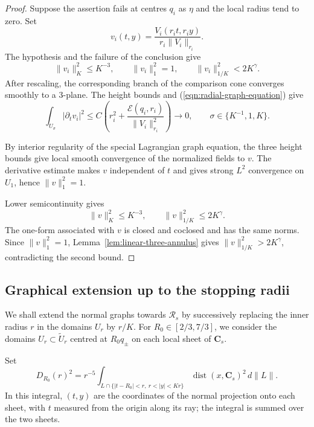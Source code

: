 \documentclass[11pt,a4paper]{article}
\numberwithin{equation}{section}
\theoremstyle{definition}
\theoremstyle{remark}
\newcommand{\dist}{\operatorname{dist}}
\begin{document}
	\begin{proof}
		Suppose the assertion fails at centres $q_i$ as $\eta$ and the local radius tend to zero.
		Set
		\[
		v_i(t,y)=\frac{V_i(r_it,r_iy)}{r_i\|V_i\|_{r_i}}.
		\]
		The hypothesis and the failure of the conclusion give
		\[
		\|v_i\|_K^2\le K^{-3},\qquad
		\|v_i\|_1^2=1,\qquad
		\|v_i\|_{1/K}^2<2K^{\gamma}.
		\]
		After rescaling, the corresponding branch of the comparison cone converges
		smoothly to a 3-plane.
		The height bounds and (\ref{eqn:radial-graph-equation}) give
		\[
		\int_{U_\sigma}|\partial_t v_i|^2
		\le C\left(r_i^2+\frac{\mathcal E(q_i,r_i)}{\|V_i\|_{r_i}^2}\right)
		\longrightarrow0,
		\qquad \sigma\in\{K^{-1},1,K\}.
		\]
		
		By interior regularity of the special Lagrangian graph equation,
		the three height bounds give local smooth convergence of the normalized
		fields to $v$. The derivative estimate makes $v$ independent of $t$ and
		gives strong $L^2$ convergence on $U_1$, hence $\|v\|_1^2=1$.
		
		Lower semicontinuity gives
		\[
		\|v\|_K^2\le K^{-3},\qquad
		\|v\|_{1/K}^2\le2K^{\gamma}.
		\]
		The one-form associated with $v$ is closed and coclosed and has the
		same norms. Since $\|v\|_1^2=1$, Lemma~\ref{lem:linear-three-annulus}
		gives $\|v\|_{1/K}^2>2K^{\gamma}$, contradicting the second bound.
	\end{proof}
	
	\subsection{Graphical extension up to the stopping radii}
	\label{sect:stopping-construction}
	
	We shall extend the normal graphs towards $\mathcal R_s$ by successively
	replacing the inner radius $r$ in the domains $U_r$ by $r/K$.
	For $R_0\in[2/3,7/3]$, we consider the domains $U_r\subset\widetilde U_r$
	centred at $R_0q_\pm$ on each local sheet of $\mathbf C_s$.
	
	Set
	\[
	D_{R_0}(r)^2=r^{-5}\int_{L\cap\{|t-R_0|<r,\ r<|y|<Kr\}}
	\dist(x,\mathbf C_s)^2\,d\|L\|.
	\]
	In this integral, $(t,y)$ are the coordinates of the normal projection
	onto each sheet, with $t$ measured from the origin along its ray;
	the integral is summed over the two sheets.
	
\end{document}
